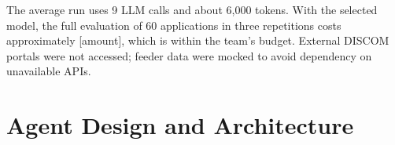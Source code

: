 \documentclass[12pt,a4paper,oneside]{report}
\newif\ifguidance
\newcommand{\guide}[1]{%
  \ifguidance
  \begin{tcolorbox}[enhanced,breakable,colback=guidebg,colframe=bmsblue,
    boxrule=0.6pt,arc=2pt,left=6pt,right=6pt,top=4pt,bottom=4pt,
    fonttitle=\bfseries\small,title={What to write here},
    before upper={\small\setstretch{1.1}}]
  #1
  \end{tcolorbox}
  \fi}
\newcommand{\pagebudget}[1]{%
  \ifguidance\noindent{\small\textcolor{bmsblue}{\textbf{Expected length:} #1 pages}}\par\medskip\fi}
\newenvironment{sample}
  {\par\noindent{\footnotesize\bfseries\textcolor{BrickRed}{[SAMPLE --- replace with your own content]}}\par\color{samplecol}}
  {\par\medskip}
\begin{document}
\begin{sample}
The average run uses 9 LLM calls and about 6{,}000 tokens. With the selected model, the full evaluation
of 60 applications in three repetitions costs approximately [amount], which is within the team's
budget. External DISCOM portals were not accessed; feeder data were mocked to avoid dependency on
unavailable APIs.
\end{sample}


\chapter{Agent Design and Architecture}
\pagebudget{5--7}
\guide{This is the central design chapter. Present the architecture diagram, describe every
component, state the agentic patterns you selected, show the data and control flow, and justify each
design decision against alternatives.}
\end{document}
